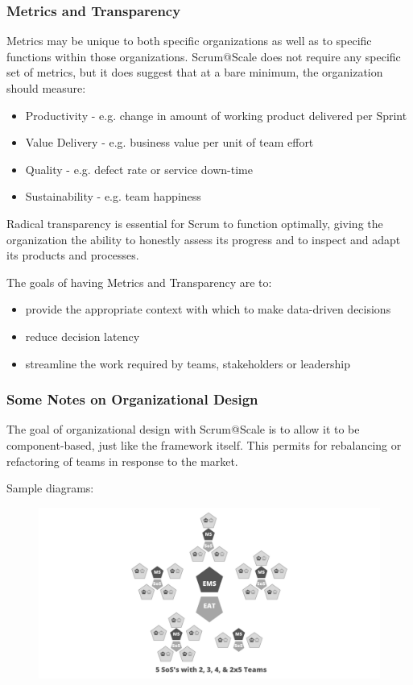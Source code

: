 \documentclass[12pt,a4paper,parskip=full]{scrartcl}
\begin{document}
\subsubsection{Metrics and Transparency}\label{Metrics-and-transparency}

Metrics may be unique to both specific organizations as well as to specific functions within those organizations. Scrum@Scale does not require any specific set of metrics, but it does suggest that at a bare minimum, the organization should measure:

\begin{itemize}
\itemsep1pt\parskip0pt
\item
  Productivity - e.g. change in amount of working product delivered per
  Sprint
\item
  Value Delivery - e.g. business value per unit of team effort
\item
  Quality - e.g. defect rate or service down-time
\item
  Sustainability - e.g. team happiness
\end{itemize}

Radical transparency is essential for Scrum to function optimally, giving the organization the ability to honestly assess its progress and to inspect and adapt its products and processes.

The goals of having Metrics and Transparency are to:

\begin{itemize}
\itemsep1pt\parskip0pt
\item
  provide the appropriate context with which to make data-driven
  decisions
\item
  reduce decision latency
\item
  streamline the work required by teams, stakeholders or leadership
\end{itemize}

\subsubsection{Some Notes on Organizational
Design}\label{some-notes-on-organizational-design}

The goal of organizational design with Scrum@Scale is to allow it to be component-based, just like the framework itself. This permits for rebalancing or refactoring of teams in response to the market.

Sample diagrams:
\begin{figure}[H]
    \centering
    \includegraphics[scale=0.15]{4.png}
\end{figure}
\end{document}
